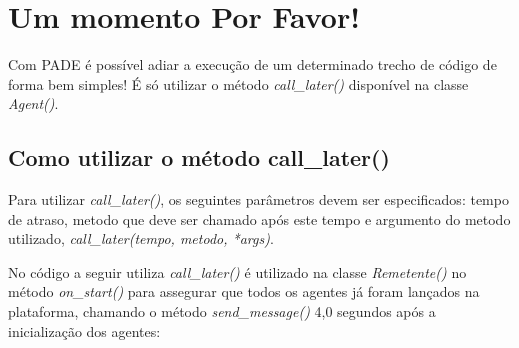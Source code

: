 \documentclass[letterpaper,10pt,brazil]{sphinxmanual}
\begin{document}
\section{Um momento Por Favor!}
\label{user/um-momento::doc}\label{user/um-momento:um-momento-por-favor}
Com PADE é possível adiar a execução de um determinado trecho de código de forma bem simples! É só utilizar o método \emph{call\_later()} disponível na classe \emph{Agent()}.


\subsection{Como utilizar o método call\_later()}
\label{user/um-momento:como-utilizar-o-metodo-call-later}
Para utilizar \emph{call\_later()}, os seguintes parâmetros devem ser especificados: tempo de atraso, metodo que deve ser chamado após este tempo e argumento do metodo utilizado, \emph{call\_later(tempo, metodo, *args)}.

No código a seguir utiliza \emph{call\_later()} é utilizado na classe \emph{Remetente()} no método \emph{on\_start()} para assegurar que todos os agentes já foram lançados na plataforma, chamando o método \emph{send\_message()} 4,0 segundos após a inicialização dos agentes:
\end{document}
